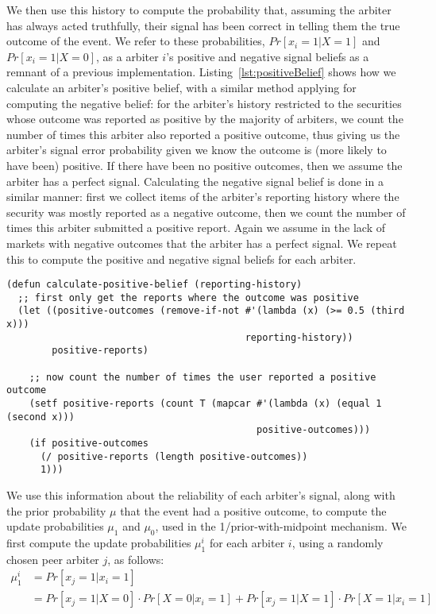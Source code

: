 We then use this history to compute the probability that, assuming the arbiter
has always acted truthfully, their signal has been correct in telling them the
true outcome of the event. We refer to these probabilities, $Pr[x_i=1|X=1]$ and
$Pr[x_i=1|X=0]$, as a arbiter $i$'s positive and negative signal beliefs as a
remnant of a previous implementation. Listing~\ref{lst:positiveBelief} shows
how we calculate an arbiter's positive belief, with a similar method applying
for computing the negative belief: for the arbiter's history restricted to the
securities whose outcome was reported as positive by the majority of arbiters,
we count the number of times this arbiter also reported a positive outcome,
thus giving us the arbiter's signal error probability given we know the outcome
is (more likely to have been) positive. If there have been no positive
outcomes, then we assume the arbiter has a perfect signal. Calculating the
negative signal belief is done in a similar manner: first we collect items of
the arbiter's reporting history where the security was mostly reported as a
negative outcome, then we count the number of times this arbiter submitted a
positive report. Again we assume in the lack of markets with negative outcomes
that the arbiter has a perfect signal. We repeat this to compute the positive
and negative signal beliefs for each arbiter.

\begin{lstlisting}[float,
	label={lst:positiveBelief},
	caption={Computing an arbiter's positive signal belief given
	their reporting history}]
(defun calculate-positive-belief (reporting-history)
  ;; first only get the reports where the outcome was positive
  (let ((positive-outcomes (remove-if-not #'(lambda (x) (>= 0.5 (third x)))
                                          reporting-history))
        positive-reports)

    ;; now count the number of times the user reported a positive outcome
    (setf positive-reports (count T (mapcar #'(lambda (x) (equal 1 (second x)))
                                            positive-outcomes)))
    (if positive-outcomes
      (/ positive-reports (length positive-outcomes))
      1)))
\end{lstlisting}

We use this information about the reliability of each arbiter's signal, along
with the prior probability $\mu$ that the event had a positive outcome, to
compute the update probabilities $\mu_1$ and $\mu_0$, used in the
1/prior-with-midpoint mechanism. We first compute the update
probabilities $\mu_1^i$ for each arbiter $i$, using a randomly chosen peer
arbiter $j$, as follows:
%
\begin{equation}
	\label{eq:updateProbabilities}
	\begin{aligned}
		\mu_1^i & = Pr[x_j=1|x_i=1] \\
		& = Pr[x_j=1|X=0] \cdot Pr[X=0|x_i=1] + Pr[x_j=1|X=1] \cdot Pr[X=1|x_i=1]
	\end{aligned}
\end{equation}

